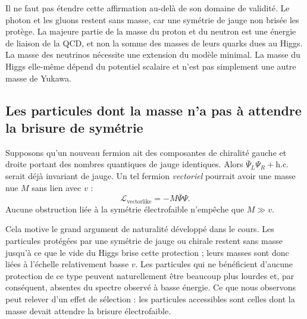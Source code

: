 Il ne faut pas étendre cette affirmation au-delà de son domaine de validité. Le photon et les gluons restent sans masse, car une symétrie de jauge non brisée les protège. La majeure partie de la masse du proton et du neutron est une énergie de liaison de la QCD, et non la somme des masses de leurs quarks dues au Higgs. La masse des neutrinos nécessite une extension du modèle minimal. La masse du Higgs elle-même dépend du potentiel scalaire et n’est pas simplement une autre masse de Yukawa.

\subsection{Les particules dont la masse n’a pas à attendre la brisure de symétrie}

Supposons qu’un nouveau fermion ait des composantes de chiralité gauche et droite portant des nombres quantiques de jauge identiques. Alors
\(\bar\Psi_L\Psi_R+\mathrm{h.c.}\) serait déjà invariant de jauge. Un tel fermion \emph{vectoriel} pourrait avoir une masse nue \(M\) sans lien avec \(v\) :
\begin{equation}
  \mathcal L_{\mathrm{vectorlike}}
  =-M\bar\Psi\Psi.
  \label{eq:l09-vectorlike-mass}
\end{equation}
Aucune obstruction liée à la symétrie électrofaible n’empêche que \(M\gg v\).

Cela motive le grand argument de naturalité développé dans le cours. Les particules protégées par une symétrie de jauge ou chirale restent sans masse jusqu’à ce que le vide du Higgs brise cette protection ; leurs masses sont donc liées à l’échelle relativement basse \(v\). Les particules qui ne bénéficient d’aucune protection de ce type peuvent naturellement être beaucoup plus lourdes et, par conséquent, absentes du spectre observé à basse énergie. Ce que nous observons peut relever d’un effet de sélection : les particules accessibles sont celles dont la masse devait attendre la brisure électrofaible.

\begin{classroomqa}
\end{classroomqa}

